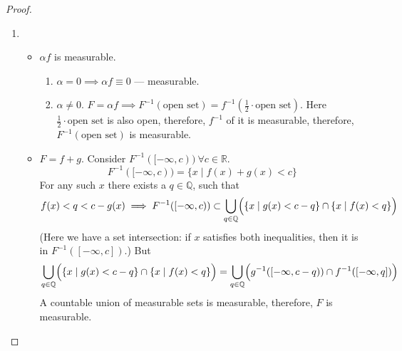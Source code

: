\begin{proof}
    \mbox{}
    \begin{enumerate}
        \item {
            \mbox{}
            \begin{itemize}
                \item {
                    $\alpha f$ is measurable.
                    \begin{enumerate}
                        \item {
                            $\alpha = 0 \implies \alpha f \equiv 0$ --- measurable.
                        }
                        \item {
                            $\alpha \ne 0$.
                            $F = \alpha f \implies F^{-1}(\text{open set}) =
                            f^{-1}(\frac{1}{2} \cdot \text{open set})$.
                            Here
                            $\frac{1}{2} \cdot \text{open set}$
                            is also open, therefore,
                            $f^{-1}$ of it is measurable, therefore, $F^{-1}(\text{open set})$
                            is measurable.
                        }
                    \end{enumerate}
                }
                \item {
                    $F = f + g$. Consider $F^{-1}([-\infty, c))\ \forall c \in \mathbb{R}$.
                    \[ F^{-1}([-\infty, c)) = \{ x \mid f(x) + g(x) < c \} \]
                    For any such $x$ there exists a $q \in \mathbb{Q}$, such that
                    \[ f(x) < q < c - g(x) \implies
                    F^{-1}([-\infty, c)) \subset \bigcup_{q \in \mathbb{Q}}
                    \Bigl(\{ x \mid g(x) < c - q \} \cap \{ x \mid f(x) < q \} \Bigr) \]
                    (Here we have a set intersection: if $x$ satisfies both inequalities,
                    then it is in $F^{-1}([-\infty, c])$.)
                    But
                    \[
                        \bigcup_{q \in \mathbb{Q}}
                        \Bigl(\{ x \mid g(x) < c - q \} \cap \{ x \mid f(x) < q \} \Bigr) =
                        \bigcup_{q \in \mathbb{Q}} \Bigl( 
                            g^{-1}([-\infty, c - q)) \cap f^{-1}([-\infty, q])
                         \Bigr)                       
                    \]
                    A countable union of measurable sets is measurable,
                    therefore, $F$ is measurable.
                }
            \end{itemize}
}
\end{enumerate}
\end{proof}
